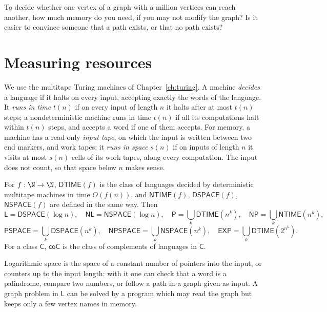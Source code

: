 \begin{think}
To decide whether one vertex of a graph with a million vertices can reach another, how much memory do you need, if you may not modify the graph? Is it easier to convince someone that a path exists, or that no path exists?
\end{think}

\section{Measuring resources}\label{sec:resources}

We use the multitape Turing machines of Chapter~\ref{ch:turing}. A machine \emph{decides} a language if it halts on every input, accepting exactly the words of the language. It \emph{runs in time} $t(n)$ if on every input of length $n$ it halts after at most $t(n)$ steps; a nondeterministic machine runs in time $t(n)$ if all its computations halt within $t(n)$ steps, and accepts a word if one of them accepts. For memory, a machine has a read-only \emph{input tape}, on which the input is written between two end markers, and work tapes; it \emph{runs in space} $s(n)$ if on inputs of length $n$ it visits at most $s(n)$ cells of its work tapes, along every computation. The input does not count, so that space below $n$ makes sense.

\begin{definition}\label{def:classes}
For $f:\N\to\N$, $\mathsf{DTIME}(f)$ is the class of languages decided by deterministic multitape machines in time $O(f(n))$, and $\mathsf{NTIME}(f)$, $\mathsf{DSPACE}(f)$, $\mathsf{NSPACE}(f)$ are defined in the same way. Then
\[
\mathsf L=\mathsf{DSPACE}(\log n),\quad\mathsf{NL}=\mathsf{NSPACE}(\log n),\quad\mathsf P=\bigcup_k\mathsf{DTIME}(n^k),\quad\mathsf{NP}=\bigcup_k\mathsf{NTIME}(n^k),
\]
\[
\mathsf{PSPACE}=\bigcup_k\mathsf{DSPACE}(n^k),\quad\mathsf{NPSPACE}=\bigcup_k\mathsf{NSPACE}(n^k),\quad\mathsf{EXP}=\bigcup_k\mathsf{DTIME}(2^{n^k}).
\]
For a class $\mathsf C$, $\mathsf{coC}$ is the class of complements of languages in $\mathsf C$.
\end{definition}

Logarithmic space is the space of a constant number of pointers into the input, or counters up to the input length: with it one can check that a word is a palindrome, compare two numbers, or follow a path in a graph given as input. A graph problem in $\mathsf L$ can be solved by a program which may read the graph but keeps only a few vertex names in memory.

